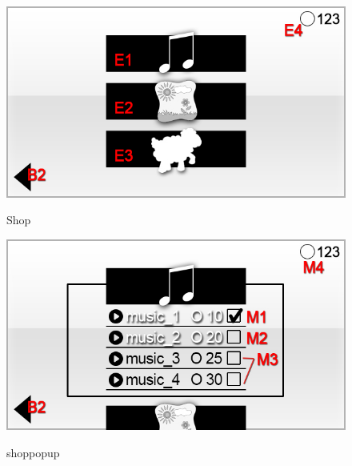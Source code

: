\begin{figure}[H]
\label{fig:shop}
\centering
\includegraphics[scale=0.55]{../gui/_jpeg_numeration/shop.jpg}
\caption{Shop}
\end{figure}

\begin{figure}[H]
\label{fig:shop_popup}
\centering
\includegraphics[scale=0.55]{../gui/_jpeg_numeration/shop_popup.jpg}
\caption{shoppopup}
\end{figure}

